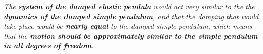 
\textit{The \textbf{system of the damped elastic pendula} would act very similar to the the \textbf{dynamics of the damped simple pendulum}, and that the damping that would take place would be \textbf{nearly equal} to the damped simple pendulum, which means that the \textbf{motion should be approximately similar to the simple pendulum in all degrees of freedom}.}



